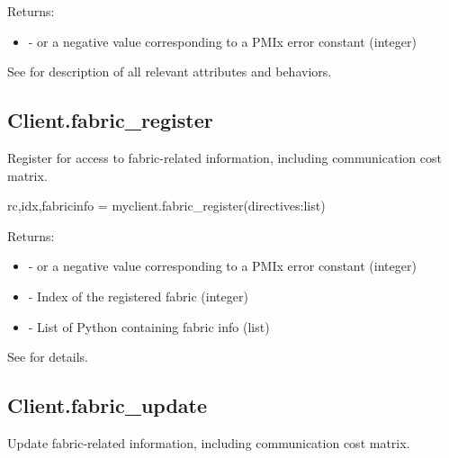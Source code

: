 Returns:
\begin{itemize}
    \item {} -  or a negative value corresponding to a PMIx error constant (integer)
\end{itemize}

See  for description of all relevant attributes and behaviors.


\subsection{Client.fabric_register}

\summary
Register for access to fabric-related information, including communication cost matrix.

\format

\pyspecificstart
\begin{codepar}
rc,idx,fabricinfo = myclient.fabric_register(directives:list)
\end{codepar}
\pyspecificend


\begin{arglist}
\end{arglist}

Returns:

\begin{itemize}
    \item {} -  or a negative value corresponding to a PMIx error constant (integer)
    \item {} - Index of the registered fabric (integer)
    \item {} - List of Python  containing fabric info (list)
\end{itemize}

See  for details.


\subsection{Client.fabric_update}

\summary
Update fabric-related information, including communication cost matrix.

